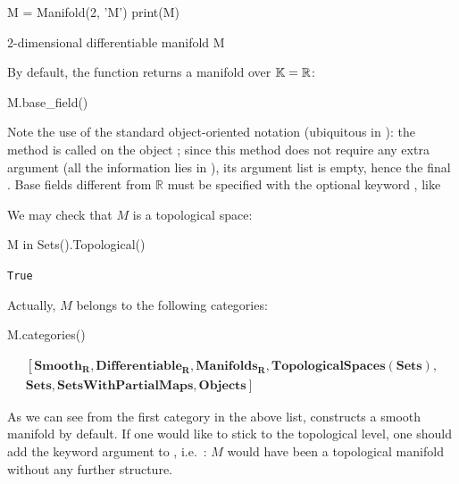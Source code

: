\begin{NBin}
M = Manifold(2, 'M')
print(M)
\end{NBin}
\begin{NBprint}
2-dimensional differentiable manifold M
\end{NBprint}
By default, the function  returns a manifold over $\mathbb{K}=\mathbb{R}$:
\begin{NBin}
M.base_field()
\end{NBin}
\begin{NBoutM}
\end{NBoutM}
Note the use of the standard object-oriented notation (ubiquitous in
): the method  is called on the object ;
since this method does not require any extra argument (all the information lies
in ), its argument list is empty, hence the final \code{()}.
Base fields different from $\mathbb{R}$
must be specified with the optional keyword , like
\begin{flushleft}
\end{flushleft}
We may check that $M$ is a topological space:
\begin{NBin}
M in Sets().Topological()
\end{NBin}
\begin{NBout}
\texttt{True}
\end{NBout}
Actually, $M$ belongs to the following categories:
\begin{NBin}
M.categories()
\end{NBin}
\begin{NBout}
\vspace{-25pt}  %
\begin{gather*}
\left[\mathbf{Smooth}_{\mathbf{R}}, \mathbf{Differentiable}_{\mathbf{R}}, \mathbf{Manifolds}_{\mathbf{R}}, \mathbf{TopologicalSpaces}(\mathbf{Sets}), \right.
\\ \left. \mathbf{Sets},  \mathbf{SetsWithPartialMaps}, \mathbf{Objects}\right]
\end{gather*}
\end{NBout}
As we can see from the first category in the above list, 
constructs a smooth manifold by default.
If one would like to stick to the topological level, one should add
the keyword argument  to ,
i.e.\ : $M$ would have
been a topological manifold without any further structure.

